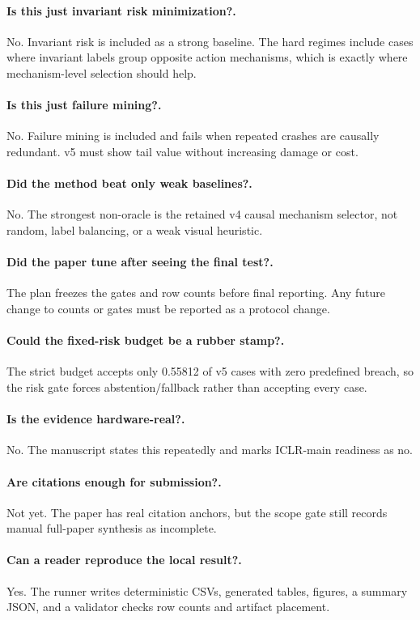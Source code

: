 \documentclass{article}
\begin{document}
\paragraph{Is this just invariant risk minimization?.} No. Invariant risk is included as a strong baseline. The hard regimes include cases where invariant labels group opposite action mechanisms, which is exactly where mechanism-level selection should help.
\paragraph{Is this just failure mining?.} No. Failure mining is included and fails when repeated crashes are causally redundant. v5 must show tail value without increasing damage or cost.
\paragraph{Did the method beat only weak baselines?.} No. The strongest non-oracle is the retained v4 causal mechanism selector, not random, label balancing, or a weak visual heuristic.
\paragraph{Did the paper tune after seeing the final test?.} The plan freezes the gates and row counts before final reporting. Any future change to counts or gates must be reported as a protocol change.
\paragraph{Could the fixed-risk budget be a rubber stamp?.} The strict budget accepts only 0.55812 of v5 cases with zero predefined breach, so the risk gate forces abstention/fallback rather than accepting every case.
\paragraph{Is the evidence hardware-real?.} No. The manuscript states this repeatedly and marks ICLR-main readiness as no.
\paragraph{Are citations enough for submission?.} Not yet. The paper has real citation anchors, but the scope gate still records manual full-paper synthesis as incomplete.
\paragraph{Can a reader reproduce the local result?.} Yes. The runner writes deterministic CSVs, generated tables, figures, a summary JSON, and a validator checks row counts and artifact placement.
\end{document}
